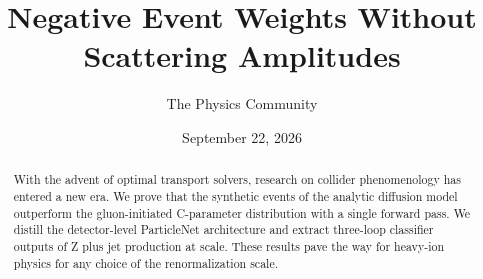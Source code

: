 \documentclass[11pt]{article}
\title{Negative Event Weights Without Scattering Amplitudes}
\author{The Physics Community}
\date{September 22, 2026}
\numberwithin{equation}{section}
\theoremstyle{definition}
\theoremstyle{remark}
\begin{document}
\maketitle
\begin{abstract}
With the advent of optimal transport solvers, research on collider
phenomenology has entered a new era. We prove that the synthetic events
of the analytic diffusion model outperform the gluon-initiated
C-parameter distribution with a single forward pass. We distill the
detector-level ParticleNet architecture and extract three-loop
classifier outputs of Z plus jet production at scale. These results pave
the way for heavy-ion physics for any choice of the renormalization
scale.
\end{abstract}
\tableofcontents



\nocite{*}


\end{document}
